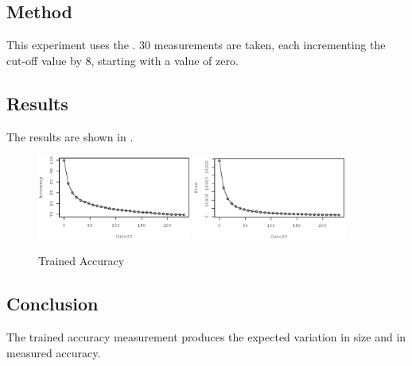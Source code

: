 \subsection{Method}
This experiment uses the . $30$ measurements are taken, each incrementing the cut-off value by $8$, starting with a value of zero.
\subsection{Results}
The results are shown in .
\begin{figure} 
\centering
\subfigure %
{
	\includegraphics[width=0.45\textwidth]{artifacts/c4-027acc.eps}
}
\qquad
\subfigure %
{
	\includegraphics[width=0.45\textwidth]{artifacts/c4-027size.eps}
}
\caption{Trained Accuracy}
\label{fig:c4-027}
\end{figure}

\subsection{Conclusion}
The trained accuracy measurement produces the expected variation in size and in measured accuracy.
